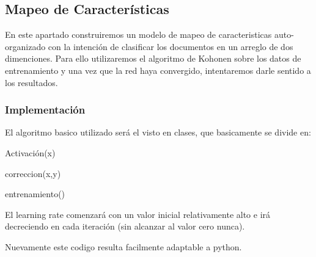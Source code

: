 \pagebreak

\subsection{Mapeo de Características}

En este apartado construiremos un modelo de mapeo de caracteristicas auto-organizado con la intención de clasificar los documentos en un arreglo de dos dimenciones. Para ello utilizaremos el algoritmo de Kohonen sobre los datos de entrenamiento y una vez que la red haya convergido, intentaremos darle sentido a los resultados.

\subsubsection{Implementación}

El algoritmo basico utilizado será el visto en clases, que basicamente se divide en:

\begin{algorithm}
\begin{algorithmic}[1]\parskip=1mm
 \caption{ Activación(x)}
\end{algorithmic}
\end{algorithm}

\begin{algorithm}
\begin{algorithmic}[1]\parskip=1mm
 \caption{ correccion(x,y)}
\end{algorithmic}
\end{algorithm}

\begin{algorithm}
\begin{algorithmic}[1]\parskip=1mm
 \caption{ entrenamiento()}
\end{algorithmic}
\end{algorithm}

El learning rate comenzará con un valor inicial relativamente alto e irá decreciendo en cada iteración (sin alcanzar al valor cero nunca).

Nuevamente este codigo resulta facilmente adaptable a python.


